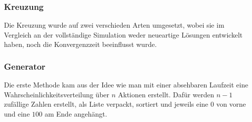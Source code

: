             \subsubsection*{Kreuzung}
            Die Kreuzung wurde auf zwei verschieden Arten umgesetzt, wobei sie im Vergleich an der vollständige Simulation weder neueartige Lösungen entwickelt haben, noch die Konvergenzzeit beeinflusst wurde.

            \subsubsection*{Generator}
            Die erste Methode kam aus der Idee wie man mit einer absehbaren Laufzeit eine Wahrscheinlichkeitsverteilung über $n$ Aktionen erstellt. Dafür werden $n-1$ zufällige Zahlen erstellt, als Liste verpackt, sortiert und jeweils eine $0$ von vorne und eine $100$ am Ende angehängt.

